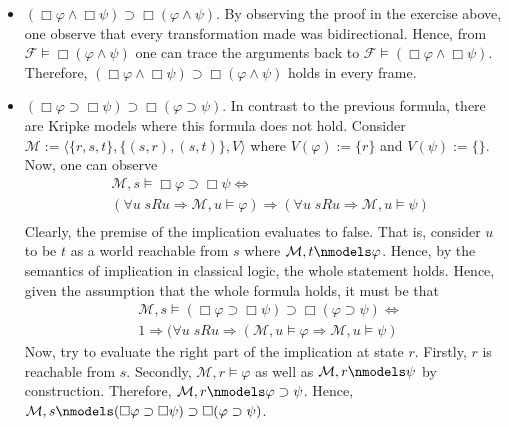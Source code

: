 \documentclass[11pt,a4paper]{article}
\newcommand{\lto}{\supset}
\newcommand{\all}{\Box}
\newcommand{\sto}{\Rightarrow}
\begin{document}
\begin{itemize}
\item $(\all \varphi \land \all \psi)  \lto  \all (\varphi \land \psi)$. By observing the proof in the exercise above, one observe that every transformation made was bidirectional. Hence, from $\mathcal{F} \models  \all (\varphi \land \psi)$ one can trace the arguments back to $\mathcal{F} \models  (\all \varphi \land \all \psi)$.  Therefore, $(\all \varphi \land \all \psi)  \lto  \all (\varphi \land \psi)$ holds in every frame.

\item $(\all \varphi \lto \all \psi) \lto \all (\varphi \lto \psi)$. In contrast to the previous formula, there are Kripke models where this formula does not hold. Consider $\mathcal{M}:=\langle \{r,s,t\}, \{(s,r),(s,t)\}, V\rangle$ where $V(\varphi):=\{r\}$ and $V(\psi):=\{\}$. Now, one can observe
\begin{equation*}
\begin{split}
& \mathcal{M}, s \models \all \varphi \lto \all \psi \iff \\
& (\forall u \; sRu \sto \mathcal{M}, u \models \varphi) \sto (\forall u \; sRu \sto \mathcal{M}, u \models \psi) \\
\end{split}
\end{equation*} 
Clearly, the premise of the implication evaluates to false. That is, consider $u$ to be $t$ as a world reachable from $s$ where $\mathcal{M}, t \nmodels \varphi$. Hence, by the semantics of implication in classical logic, the whole statement holds. Hence, given the assumption that the whole formula holds, it must be that 
\begin{equation*}
\begin{split}
&\mathcal{M}, s \models (\all \varphi \lto \all \psi) \lto \all (\varphi \lto \psi) \iff \\
& 1 \sto (\forall u \; sRu \sto (\mathcal{M}, u \models \varphi \sto \mathcal{M}, u \models \psi)
\end{split}
\end{equation*} 
Now, try to evaluate the right part of the implication at state $r$. Firstly, $r$ is reachable from $s$. Secondly, $\mathcal{M}, r \models \varphi$ as well as  $\mathcal{M}, r \nmodels \psi$ by construction. 
Therefore, $\mathcal{M}, r \nmodels \varphi \lto \psi$. Hence, $\mathcal{M}, s \nmodels (\all \varphi \lto \all \psi) \lto \all (\varphi \lto \psi)$.
\end{itemize}
\end{document}
